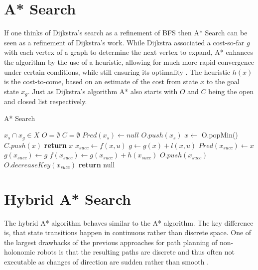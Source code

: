 \section{A* Search}
If one thinks of Dijkstra's search as a refinement of BFS then A* Search can be seen as a refinement of Dijkstra's work. While Dijkstra associated a cost-so-far $g$ with each vertex of a graph to determine the next vertex to expand, A* enhances the algorithm by the use of a heuristic, allowing for much more rapid convergence under certain conditions, while still ensuring its optimality \cite{Hart.1968}. The heuristic $h(x)$ is the cost-to-come, based on an estimate of the cost from state $x$ to the goal state $x_g$. Just as Dijkstra's algorithm A* also starts with $O$ and $C$ being the open and closed list respectively.

\begin{algorithm}
    \caption{A* Search}\label{alg:A*}
    \begin{algorithmic}[1]
        \Require $x_s \cap x_g \in X$
        \State $O = \emptyset$
        \State $C = \emptyset$
        \State $Pred(x_s) \gets null$
        \State $O.push(x_s)$
            \State $x \gets$ O.popMin()
            \State $C.push(x)$
                \State \textbf{return} $x$
            \Else
                \State $x_{succ} \gets f(x,u)$
                        \State $g \gets g(x) + l(x,u)$
                            \State $Pred(x_{succ}) \gets x$
                            \State $g(x_{succ}) \gets g$
                            \State $f(x_{succ}) \gets g(x_{succ}) + h(x_{succ})$
                                \State $O.push(x_{succ})$
                            \Else
                                \State $O.decreaseKey(x_{succ})$
                            \EndIf
                        \EndIf
                    \EndIf
                \EndFor
            \EndIf
        \EndWhile
        \State \textbf{return} null
    \end{algorithmic}
\end{algorithm}

\newpage
\section{Hybrid A* Search}
The hybrid A* algorithm behaves similar to the A* algorithm. The key difference is, that state transitions happen in continuous rather than discrete space. One of the largest drawbacks of the previous approaches for path planning of non-holonomic robots is that the resulting paths are discrete and thus often not executable as changes of direction are sudden rather than smooth \cite{Montemerlo.2008,Dolgov2010}.


